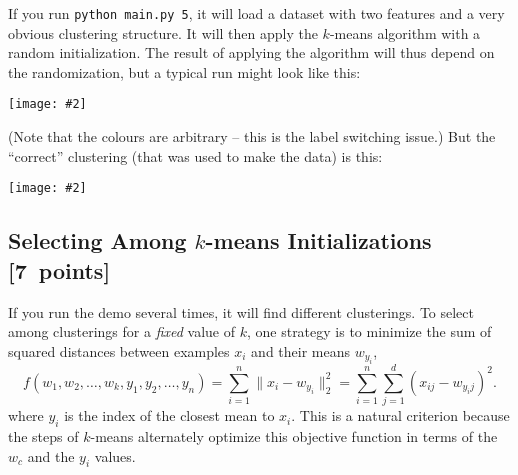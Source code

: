\documentclass{article}
\newcommand\pts[1]{\textcolor{pointscolour}{[#1~points]}}
\newcommand{\norm}[1]{\lVert #1 \rVert}
\newcommand{\centerfig}[2]{\begin{center}\texttt{[image: \#2]}\end{center}}
\begin{document}
    If you run \verb|python main.py 5|, it will load a dataset with two features
    and a very obvious clustering structure. It will then apply the $k$-means algorithm
    with a random initialization. The result of applying the
    algorithm will thus depend on the randomization, but a typical run might look like this:
    \centerfig{.5}{figs/kmeans_basic.png}
    (Note that the colours are arbitrary -- this is the label switching issue.)
    But the ``correct'' clustering (that was used to make the data) is this:
    \centerfig{.5}{figs/kmeans_good.png}


    \clearpage
    \subsection{Selecting Among $k$-means Initializations \pts{7}}

    If you run the demo several times, it will find different clusterings. To select among clusterings for a \emph{fixed} value of $k$, one strategy is to minimize the sum of squared distances between examples $x_i$ and their means $w_{y_i}$,
    \[
    f(w_1,w_2,\dots,w_k,y_1,y_2,\dots,y_n) = \sum_{i=1}^n \norm{x_i - w_{y_i}}_2^2 = \sum_{i=1}^n \sum_{j=1}^d (x_{ij} - w_{y_ij})^2.
    \]
    where $y_i$ is the index of the closest mean to $x_i$. This is a natural criterion because the steps of $k$-means alternately optimize this objective function in terms of the $w_c$ and the $y_i$ values.
\end{document}
